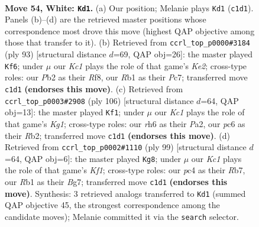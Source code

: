 \documentclass[11pt]{article}
\begin{document}
\clearpage

\begin{figure}[p]\centering
\begin{subfigure}{0.46\textwidth}\centering
\resizebox{\linewidth}{!}{%
\newchessgame
\chessboard[
  setfen={2rk1b2/6p1/p1p4r/Pp1b1p1p/2p2P1P/2B1P1P1/1P5N/1RK3R1 w - - 9 54},
  showmover=false,
  pgfstyle=straightmove, color=movearrow, markmove={c1-d1}
]}
\caption{}
\end{subfigure}\hfill
\begin{subfigure}{0.46\textwidth}\centering
\resizebox{\linewidth}{!}{%
\newchessgame
\chessboard[
  setfen={5r2/2p1kb1p/2Bp3r/pPp2p2/P1P2Pp1/4P3/4RP1P/2R3K1 b - - 45 47},
  showmover=false,
  pgfstyle=straightmove, color=movearrow, markmove={e7-f6}
]}
\caption{}
\end{subfigure}
\\[4pt]
\begin{subfigure}{0.46\textwidth}\centering
\resizebox{\linewidth}{!}{%
\newchessgame
\chessboard[
  setfen={r7/5p2/1p1rk3/1B1p3p/P1pPp2P/4PbP1/PR3P2/1R4K1 w - - 19 54},
  showmover=false,
  pgfstyle=straightmove, color=movearrow, markmove={g1-f1}
]}
\caption{}
\end{subfigure}\hfill
\begin{subfigure}{0.46\textwidth}\centering
\resizebox{\linewidth}{!}{%
\newchessgame
\chessboard[
  setfen={3r1k2/1r2p1b1/p2pP1p1/PnpP1pPp/2B2P1P/1P4RR/8/2B1K3 b - - 24 50},
  showmover=false,
  pgfstyle=straightmove, color=movearrow, markmove={f8-g8}
]}
\caption{}
\end{subfigure}
\caption{\textbf{Move 54, White: \texttt{Kd1}.} (a) Our position; Melanie plays \texttt{Kd1} (\texttt{c1d1}). Panels (b)--(d) are the retrieved master positions whose correspondence most drove this move (highest QAP objective among those that transfer to it). (b) Retrieved from \texttt{ccrl\_top\_p0000\#3184} (ply 93) [structural distance $d$=69, QAP obj=26]: the master played \texttt{Kf6}; under $\mu$ our \emph{Kc1} plays the role of that game's \emph{Ke2}; cross-type roles: our \emph{P}b2 as their \emph{R}f8, our \emph{R}b1 as their \emph{P}c7; transferred move \texttt{c1d1} \textbf{(endorses this move)}. (c) Retrieved from \texttt{ccrl\_top\_p0003\#2908} (ply 106) [structural distance $d$=64, QAP obj=13]: the master played \texttt{Kf1}; under $\mu$ our \emph{Kc1} plays the role of that game's \emph{Kg1}; cross-type roles: our \emph{r}h6 as their \emph{P}a2, our \emph{p}c6 as their \emph{R}b2; transferred move \texttt{c1d1} \textbf{(endorses this move)}. (d) Retrieved from \texttt{ccrl\_top\_p0002\#1110} (ply 99) [structural distance $d$=64, QAP obj=6]: the master played \texttt{Kg8}; under $\mu$ our \emph{Kc1} plays the role of that game's \emph{Kf1}; cross-type roles: our \emph{p}c4 as their \emph{R}b7, our \emph{R}b1 as their \emph{B}g7; transferred move \texttt{c1d1} \textbf{(endorses this move)}. Synthesis: 3 retrieved analogs transferred to \texttt{Kd1} (summed QAP objective 45, the strongest correspondence among the candidate moves); Melanie committed it via the \texttt{search} selector.}
\label{fig:thought-m106}
\end{figure}
\end{document}
